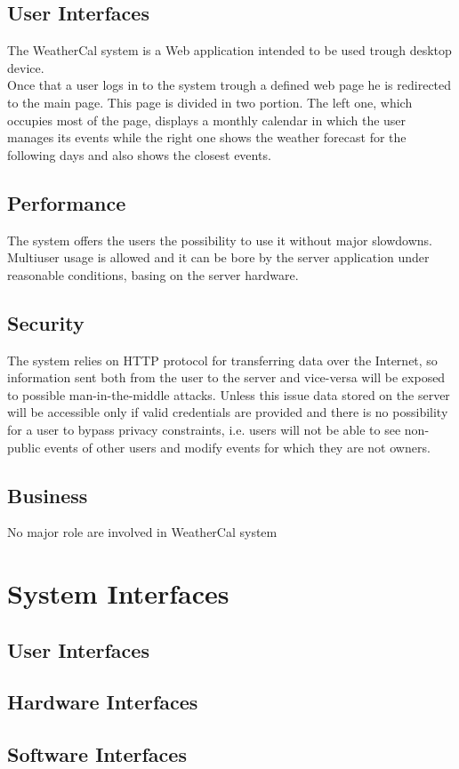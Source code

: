 \subsection{User Interfaces}
The WeatherCal system is a Web application intended to be used trough desktop device.  \\
Once that a user logs in to the system trough a defined web page he is redirected to the main page. This page is divided in two portion. The left one, which occupies most of the page, displays a monthly calendar in which the user manages its events while the right one shows the weather forecast for the following days and also shows the closest events.
\subsection{Performance}
The system offers the users the possibility to use it without major slowdowns. Multiuser usage is allowed and it can be bore by the server application under reasonable conditions, basing on the server hardware.
\subsection{Security}
The system relies on HTTP protocol for transferring data over the Internet, so information sent both from the user to the server and vice-versa will be exposed to possible man-in-the-middle attacks. Unless this issue data stored on the server will be accessible only if valid credentials are provided and there is no possibility for a user to bypass privacy constraints, i.e. users will not be able to see non-public events of other users and modify events for which they are not owners.
\subsection{Business}
No major role are involved in WeatherCal system
\section{System Interfaces}
\subsection{User Interfaces}
\subsection{Hardware Interfaces}
\subsection{Software Interfaces}
